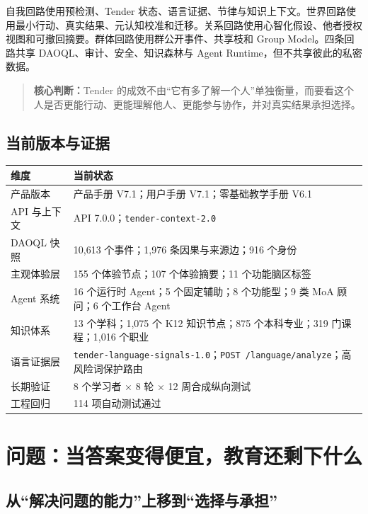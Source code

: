 \documentclass[UTF8,a4paper,11pt]{ctexart}
\newcommand{\keypoint}[1]{\begin{quote}\noindent\textbf{\color{TenderBlue}核心判断：}#1\end{quote}}
\begin{document}
自我回路使用预检测、Tender 状态、语言证据、节律与知识上下文。世界回路使用最小行动、真实结果、元认知校准和迁移。关系回路使用心智化假设、他者授权视图和可撤回摘要。群体回路使用群公开事件、共享枝和 Group Model。四条回路共享 DAOQL、审计、安全、知识森林与 Agent Runtime，但不共享彼此的私密数据。

\keypoint{Tender 的成效不由“它有多了解一个人”单独衡量，而要看这个人是否更能行动、更能理解他人、更能参与协作，并对真实结果承担选择。}

\subsection{当前版本与证据}

\begin{center}
\begin{tabularx}{\textwidth}{@{}p{4.6cm}X@{}}
\toprule
\textbf{维度} & \textbf{当前状态} \\
\midrule
产品版本 & 产品手册 V7.1；用户手册 V7.1；零基础教学手册 V6.1 \\
API 与上下文 & API 7.0.0；\texttt{tender-context-2.0} \\
DAOQL 快照 & 10,613 个事件；1,976 条因果与来源边；916 个身份 \\
主观体验层 & 155 个体验节点；107 个体验摘要；11 个功能脑区标签 \\
Agent 系统 & 16 个运行时 Agent；5 个固定辅助；8 个功能型；9 类 MoA 顾问；6 个工作台 Agent \\
知识体系 & 13 个学科；1,075 个 K12 知识节点；875 个本科专业；319 门课程；1,016 个职业 \\
语言证据层 & \texttt{tender-language-signals-1.0}；\texttt{POST /language/analyze}；高风险词保护路由 \\
长期验证 & 8 个学习者 × 8 轮 × 12 周合成纵向测试 \\
工程回归 & 114 项自动测试通过 \\
\bottomrule
\end{tabularx}
\end{center}

\newpage
\section{问题：当答案变得便宜，教育还剩下什么}

\subsection{从“解决问题的能力”上移到“选择与承担”}
\end{document}
